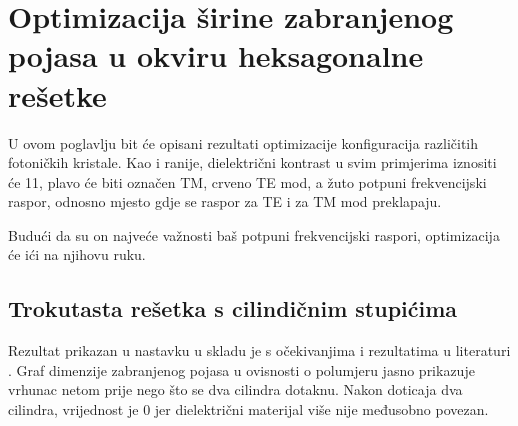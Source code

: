 \documentclass[utf8, seminar, numeric]{fer}
\begin{document}
\chapter{Optimizacija širine zabranjenog pojasa u okviru heksagonalne rešetke}

U ovom poglavlju bit će opisani rezultati optimizacije konfiguracija različitih
fotoničkih kristale. Kao i ranije, dielektrični kontrast u svim primjerima iznositi će
11, plavo će biti označen TM, crveno TE mod, a žuto potpuni frekvencijski raspor,
odnosno mjesto gdje se raspor za TE i za TM mod preklapaju.

Budući da su on najveće važnosti baš potpuni frekvencijski raspori, optimizacija
će ići na njihovu ruku.

\section{Trokutasta rešetka s cilindičnim stupićima}\label{section:cyl}

Rezultat prikazan u nastavku u skladu je s očekivanjima i rezultatima u literaturi
\cite{joannopoulos2011photonic}. Graf dimenzije zabranjenog pojasa  u ovisnosti o
polumjeru jasno prikazuje vrhunac netom prije nego što se dva cilindra dotaknu.
Nakon doticaja dva cilindra, vrijednost je 0 jer dielektrični materijal više nije
međusobno povezan.
\end{document}
